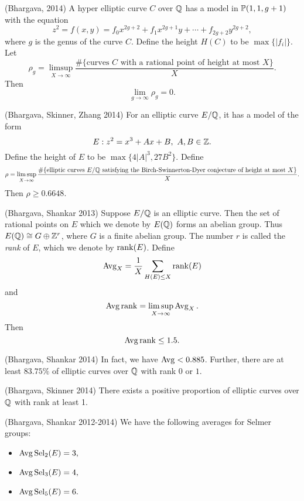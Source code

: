\documentclass[12pt,amsfont]{amsart}
\begin{document}
\begin{theorem} (Bhargava, 2014) A hyper elliptic curve $C$ over ${\mathbb Q}$ has a model in $\mathbb{P}(1,1,g+1)$ with the equation
\[z^2 = f(x,y) = f_0 x^{2g+2} + f_1 x^{2g+1}y + \cdots + f_{2g+2} y^{2g+2},\]
where $g$ is the genus of the curve $C$. Define the height $H(C)$ to be $\max\{|f_i|\}$. Let 
\[\rho_g = \limsup_{X \rightarrow \infty} \frac{\#\{\text{curves } C \text{ with a rational point of height at most } X\}}{X}.\]
Then 
\[\lim_{g \rightarrow \infty} \rho_g = 0.\]
\end{theorem}

\begin{theorem} (Bhargava, Skinner, Zhang 2014) For an elliptic curve $E/{\mathbb Q}$, it has a model of the form
\[E : z^2 = x^3 + Ax + B, \text{ } A, B \in {\mathbb Z}.\]
Define the height of $E$ to be $\max\{4|A|^3, 27B^2\}$. Define
\[\rho = \limsup_{X \rightarrow \infty} \frac{\#\{\text{elliptic curves } E/{\mathbb Q} \text{ satisfying the Birch-Swinnerton-Dyer conjecture of height at most } X\}}{X}.\]
Then $\rho \geq 0.6648$. 
\end{theorem}

\begin{theorem} (Bhargava, Shankar 2013) \cite{BS1} Suppose $E/{\mathbb Q}$ is an elliptic curve. Then the set of rational points on $E$ which we denote by $E({\mathbb Q})$ forms an abelian group. Thus $E({\mathbb Q}) \cong G \oplus {\mathbb Z}^r$, where $G$ is a finite abelian group. The number $r$ is called the \emph{rank} of $E$, which we denote by $\operatorname{rank}(E)$. Define
\[\operatorname{Avg}_X = \frac{1}{X} \sum_{H(E) \leq X} \operatorname{rank}(E)\]
and
\[\operatorname{Avg} \operatorname{rank} = \limsup_{X \rightarrow \infty} \operatorname{Avg}_X.\]
Then
\[\operatorname{Avg} \operatorname{rank} \leq 1.5.\]
\end{theorem}

\begin{theorem} (Bhargava, Shankar 2014) In fact, we have $\operatorname{Avg} < 0.885$. Further, there are at least $83.75\%$ of elliptic curves over ${\mathbb Q}$ with rank $0$ or $1$. 
\end{theorem}

\begin{theorem} (Bhargava, Skinner 2014) There exists a positive proportion of elliptic curves over ${\mathbb Q}$ with rank at least 1. 
\end{theorem}

\begin{theorem} (Bhargava, Shankar 2012-2014) We have the following averages for Selmer groups:
\begin{itemize}
\item $\displaystyle \operatorname{Avg} \operatorname{Sel}_2(E) = 3,$
\item $\displaystyle \operatorname{Avg} \operatorname{Sel}_3(E) = 4,$
\item $\displaystyle \operatorname{Avg} \operatorname{Sel}_5(E) = 6.$
\end{itemize}
\end{theorem}
\end{document}
